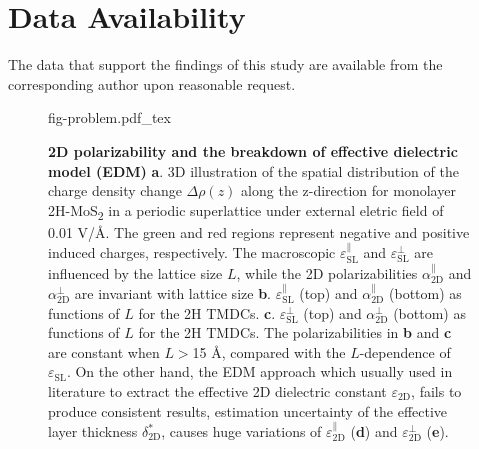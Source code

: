\section{Data Availability}
The data that support the findings of this study are available from
the corresponding author upon reasonable request.



% 

\begin{figure}[H]
\centering
{fig-problem.pdf_tex}
\caption{\label{fig-1}  \textbf{2D polarizability and the breakdown of
    effective dielectric model
    (EDM)} %
  \textbf{a}. 3D illustration of the spatial distribution of the
  charge density change $\Delta \rho(z)$ along the z-direction for
  monolayer 2H-MoS\textsubscript{2} in a periodic superlattice under
  external eletric field of 0.01 V/\AA{}.  The green and red regions
  represent negative and positive induced charges, respectively. The
  macroscopic $\varepsilon_{\mathrm{SL}}^{\parallel}$ and
  $\varepsilon_{\mathrm{SL}}^{\perp}$ are influenced by the lattice
  size $L$, while the 2D polarizabilities
  $\alpha_{\mathrm{2D}}^{\parallel}$ and
  $\alpha_{\mathrm{2D}}^{\perp}$ are invariant with lattice size
  \textbf{b}.  $\varepsilon^{\parallel}_{\mathrm{SL}}$ (top) and
  $\alpha_{\mathrm{2D}}^{\parallel}$ (bottom) as functions of $L$ for
  the 2H TMDCs. \textbf{c}.  $\varepsilon^{\perp}_{\mathrm{SL}}$ (top)
  and $\alpha_{\mathrm{2D}}^{\perp}$ (bottom) as functions of $L$ for
  the 2H TMDCs. The polarizabilities in \textbf{b} and \textbf{c} are
  constant when $L>$15 \AA{}, compared with the $L$-dependence of
  $\varepsilon_{\mathrm{SL}}$. On the other hand, the EDM approach
  which usually used in literature to extract the effective 2D
  dielectric constant $\varepsilon_{\mathrm{2D}}$, fails to produce
  consistent results, estimation uncertainty of the effective layer
  thickness $\delta^{*}_{\mathrm{2D}}$, causes huge variations of
  $\varepsilon_{\mathrm{2D}}^{\parallel}$ (\textbf{d}) and
  $\varepsilon_{\mathrm{2D}}^{\perp}$ (\textbf{e}).
}
\end{figure}

